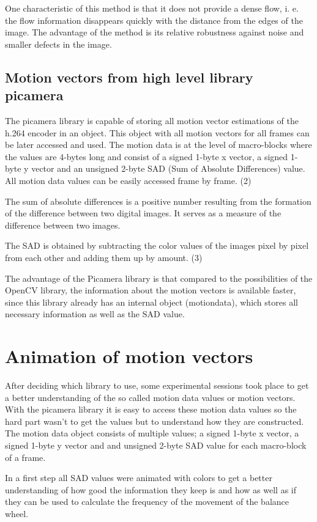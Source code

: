 \documentclass[12pt, a4paper]{report}
\begin{document}
One characteristic of this method is that it does not provide a dense flow, i. e. the flow information disappears quickly with the distance from the edges of the image. The advantage of the method is its relative robustness against noise and smaller defects in the image.

\subsection{Motion vectors from high level library picamera}
The picamera library is capable of storing all motion vector estimations of the h.264 encoder in an object. This object with all motion vectors for all frames can be later accessed and used. The motion data is at the level of macro-blocks where the values are 4-bytes long and consist of a signed 1-byte x vector, a signed 1-byte y vector and an unsigned 2-byte SAD (Sum of Absolute Differences) value. All motion data values can be easily accessed frame by frame. (2) 

The sum of absolute differences is a positive number resulting from the formation of the difference between two digital images. It serves as a measure of the difference between two images.

The SAD is obtained by subtracting the color values of the images pixel by pixel from each other and adding them up by amount. (3)

The advantage of the Picamera library is that compared to the possibilities of the OpenCV library, the information about the motion vectors is available faster, since this library already has an internal object (motiondata), which stores all necessary information as well as the SAD value. 

\section{Animation of motion vectors}
After deciding which library to use, some experimental sessions took place to get a better understanding of the so called motion data values or motion vectors. 
With the picamera library it is easy to access these motion data values so the hard part wasn't to get the values but to understand how they are constructed. 
The motion data object consists of multiple values; a signed 1-byte x vector, a signed 1-byte y vector and and unsigned 2-byte SAD value for each macro-block of a frame.

In a first step all SAD values were animated with colors to get a better understanding of how good the information they keep is and how as well as if they can be used to calculate the frequency of the movement of the balance wheel.
\end{document}
